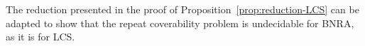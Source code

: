 \begin{remark}
	The reduction presented in the proof of Proposition~\ref{prop:reduction-LCS} can be adapted to show that the repeat coverability problem is undecidable for BNRA, as it is for LCS.
\end{remark}

